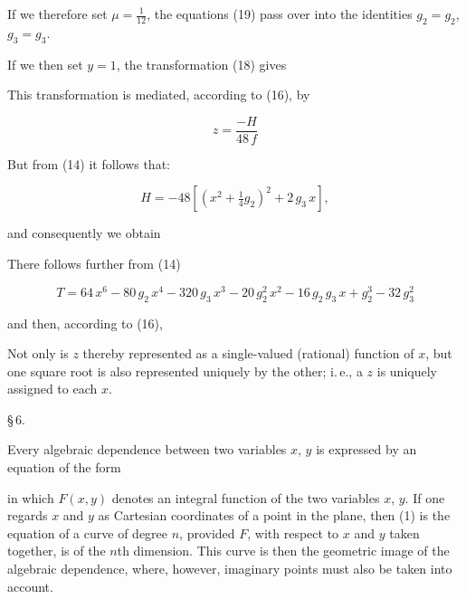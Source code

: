 
If we therefore set $\mu = \frac{1}{12}$, the equations (19)
pass over into the identities $g_2=g_2$, $g_3=g_3$.

If we then set $y=1$, the transformation (18) gives


This transformation is mediated, according to (16), by

\[ z = \dfrac{-H}{48\,f} \]

But from (14) it follows that:

\[ H = -48\left[(x^2+\tfrac{1}{4}g_2)^2 + 2\,g_3\,x\right], \]

and consequently we obtain


There follows further from (14)

\[ T = 64\,x^6 - 80\,g_2\,x^4 - 320\,g_3\,x^3 - 20\,g_2^2\,x^2 - 16\,g_2\,g_3\,x + g_2^3 - 32\,g_3^2 \]

and then, according to (16),


 Not only is
$z$ thereby represented as a single-valued (rational) function of $x$,
but one square root is also represented uniquely by the other;
i.\,e., a  $z$ is uniquely assigned to each  $x$.

\begin{center}
§\,6. 
\end{center}

Every algebraic dependence between two variables
$x$, $y$ is expressed by an equation of the form


in which $F(x,y)$ denotes an integral function of the two variables $x$, $y$.
If one regards $x$ and $y$ as Cartesian coordinates
of a point in the plane, then (1) is the equation of a curve
of degree $n$, provided $F$, with respect to $x$ and $y$ taken together,
is of the $n$th dimension. This curve is then the geometric
 image of the algebraic dependence, where, however,
imaginary points must also be taken into account.

